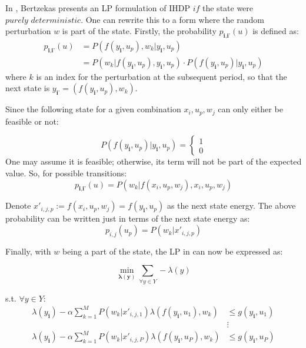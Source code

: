 \documentclass[conference]{IEEEtran}
\begin{document}
In \cite{Bertsekas:2007:DPO:1396348}, Bertzekas presents an LP formulation of IHDP $\textit{if}$ the state were $\textit{purely deterministic}$. One can rewrite this to a form where the random perturbation $w$ is part of the state. Firstly, the probability $p_{\textbf{i},\textbf{i'}}(u)$ is defined as: \begin{align*} 
p_{\textbf{i},\textbf{i'}}(u)&= P(f(y_{\textbf{i}},u_{p}),w_{k} | y_{\textbf{i}},u_{p}) \\ 
&= P(w_{k} | f(y_{\textbf{i}},u_{p}),y_{\textbf{i}},u_{p})\cdot P(f(y_{\textbf{i}},u_{p})| y_{\textbf{i}},u_{p})
\end{align*} where $k$ is an index for the perturbation at the subsequent period, so that the next state is $y_{\textbf{i'}}=(f(y_{\textbf{i}},u_{p}),w_{k})$.

Since the following state for a given combination $x_{i},u_{p},w_{j}$ can only either be feasible or not:

\begin{displaymath}
P(f(y_{\textbf{i}},u_{p})| y_{\textbf{i}},u_{p}) =
\left\{
\begin{array}{l}
1\\
0
\end{array}
\right.
\end{displaymath} One may assume it is feasible; otherwise, its term will not be part of the expected value. So, for possible transitions:
\begin{displaymath} 
p_{\textbf{i},\textbf{i'}}(u)=P(w_{k} | f(x_{i},u_{p},w_{j}),x_{i},u_{p},w_{j})
\end{displaymath}

Denote $x'_{i,j,p}:=f(x_{i},u_{p},w_{j})=f(y_{\textbf{i}},u_{p})$ as the next state energy. The above probability can be written just in terms of the next state energy as:
\begin{displaymath} 
p_{i,j}(u_{p})=P(w_{k} | x'_{i,j,p})
\end{displaymath}

Finally, with $w$ being a part of the state, the LP in \cite{Bertsekas:2007:DPO:1396348} can now be expressed as:

\begin{equation} \label{eq:prelimLP}
\min_{\boldsymbol{\lambda(y)}} \sum_{\forall y \in Y} -\lambda(y)
\end{equation}

s.t. $\forall y \in Y$: \begin{align*}
\lambda( y_{\textbf{i}})-\alpha\sum_{k=1}^{M}P(w_{k} | x'_{i,j,1})\lambda(f(y_{\textbf{i}},u_{1}),w_{k}) &\leq g(y_{\textbf{i}},u_{1}) \\
&\vdots\\
\lambda( y_{\textbf{i}})-\alpha\sum_{k=1}^{M}P(w_{k} | x'_{i,j,P})\lambda(f(y_{\textbf{i}},u_{P}),w_{k}) &\leq g(y_{\textbf{i}},u_{P})
\end{align*}
\end{document}
